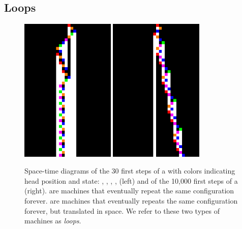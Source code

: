 
\newpage
\subsection{Loops}\label{sec:loops}

\begin{figure}[h!]
  \centering
  \includegraphics[width=0.4\textwidth]{figures/space-time-diagrams/cycler_279081.pdf}
  \hspace{2ex}
  \includegraphics[width=0.4\textwidth]{figures/space-time-diagrams/translated_cycler_44394115.pdf}
  \caption{Space-time diagrams of the 30 first steps of a \textit{\cycler}\protect\footnotemark  with colors indicating head position and state: \stateA, \stateB, \stateC, \stateD, \stateE (left) and of the 10,000 first steps of a \textit{\TC}\protect\footnotemark (right). \cyclers are machines that eventually repeat the same configuration forever. \TCs are machines that eventually repeats the same configuration forever, but translated in space. We refer to these two types of machines as \textit{loops}.}\label{fig:loops}
\end{figure}

